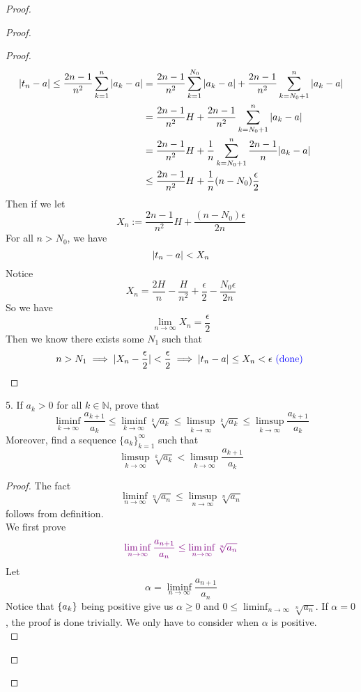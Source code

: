 \documentclass{report}
\begin{document}
\begin{proof}
\begin{proof}
\begin{proof}
\begin{align}
  |t_n-a|\leq \frac{2n-1}{n^2}\sum_{k=1}^n |a_k-a|&=\frac{2n-1}{n^2}\sum_{k=1}^{N_0}|a_k-a|+\frac{2n-1}{n^2}\sum_{k=N_0+1}^n |a_k-a|\\
&=\frac{2n-1}{n^2}H+\frac{2n-1}{n^2}\sum_{k=N_0+1}^n |a_k-a|\\
&= \frac{2n-1}{n^2}H+\frac{1}{n}\sum_{k=N_0+1}^n \frac{2n-1}{n}|a_k-a|\\
&\leq  \frac{2n-1}{n^2}H+ \frac{1}{n}(n-N_0) \frac{\epsilon }{2} 
\end{align}
Then if we let 
\begin{equation}
X_n:=\frac{2n-1}{n^2}H+\frac{(n-N_0)\epsilon }{2n}
\end{equation}
For all $n>N_0$, we have
 \begin{equation}
|t_n-a|<X_n
\end{equation}
Notice 
\begin{equation}
X_n=\frac{2H}{n}-\frac{H}{n^2}+\frac{\epsilon}{2}-\frac{N_0\epsilon }{2n}
\end{equation}
So we have
\begin{equation}
\lim_{n\to\infty}X_n=\frac{\epsilon}{2}
\end{equation}
Then we know there exists some $N_1$ such that 
 \begin{equation}
   n>N_1\implies |X_n-\frac{\epsilon}{2}|<\frac{\epsilon}{2}\implies |t_n-a|\leq X_n<\epsilon \textcolor{blue}{\text{ (done) }}
\end{equation}


\end{proof}
\begin{question}{}{}
5. If $a_k > 0$ for all $k \in \mathbb{N}$, prove that
\[
  \liminf_{k\to\infty} \frac{a_{k+1}}{a_k} \leq \liminf_{k\to\infty} \sqrt[k]{a_k} \leq \limsup_{k\to\infty} \sqrt[k]{a_k} \leq \limsup_{k\to\infty} \frac{a_{k+1}}{a_k}
\]
Moreover, find a sequence $\{a_k\}_{k=1}^{\infty}$ such that 
\[
  \limsup_{k\to\infty} \sqrt[k]{a_k} < \limsup_{k\to\infty} \frac{a_{k+1}}{a_k}
\]
\end{question}

\begin{proof}
The fact 
\begin{equation}
\liminf_{n\to\infty} \sqrt[n]{a_n}\leq \limsup_{n\to\infty} \sqrt[n]{a_n}  
\end{equation}
follows from definition.\\

We first prove
\begin{equation}
  \textcolor{violet}{\liminf_{n\to\infty} \frac{a_{n+1}}{a_n}\leq \liminf_{n\to\infty} \sqrt[n]{a_n}}
\end{equation}
Let 
\begin{equation}
\alpha =\liminf_{n\to\infty} \frac{a_{n+1}}{a_n}
\end{equation}
Notice that $\{ a_k \}$ being positive give us $\alpha \geq 0$ and $0\leq \liminf_{n\to\infty} \sqrt[n]{a_n} $. If $\alpha =0$, the proof is done trivially. We only have to consider when $\alpha $ is positive.\\


\end{proof}
\end{proof}
\end{proof}
\end{document}
